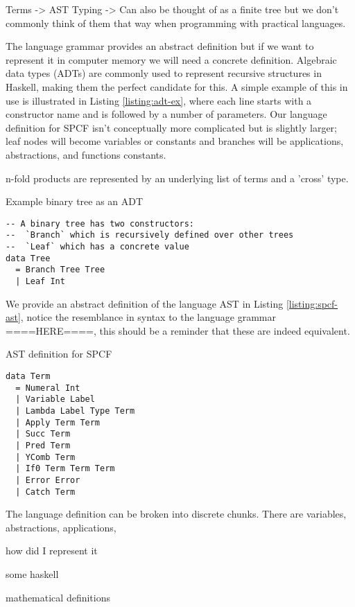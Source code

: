 \documentclass[12pt,a4paper]{report}
\theoremstyle{definition}
\theoremstyle{remark}
\begin{document}
Terms -> AST
Typing -> Can also be thought of as a finite tree but we don't commonly think of them that way when programming with practical languages.

The language grammar provides an abstract definition but if we want to represent it in computer memory we will need a concrete definition. Algebraic data types (ADTs) are commonly used to represent recursive structures in Haskell, making them the perfect candidate for this. A simple example of this in use is illustrated in Listing \ref{listing:adt-ex}, where each line starts with a constructor name and is followed by a number of parameters. Our language definition for SPCF isn't conceptually more complicated but is slightly larger; leaf nodes will become variables or constants and branches will be applications, abstractions, and functions constants. 

n-fold products are represented by an underlying list of terms and a 'cross' type.

\begin{listing}[!ht]
\caption{Example binary tree as an ADT}
\begin{verbatim}
-- A binary tree has two constructors:
--  `Branch` which is recursively defined over other trees
--  `Leaf` which has a concrete value
data Tree
  = Branch Tree Tree 
  | Leaf Int
\end{verbatim}
\label{listing:adt-ex}
\end{listing}

We provide an abstract definition of the language AST in Listing \ref{listing:spcf-ast}, notice the resemblance in syntax to the language grammar ====HERE====, this should be a reminder that these are indeed equivalent.

\begin{listing}[!ht]
\caption{AST definition for SPCF}
\begin{verbatim}
data Term
  = Numeral Int
  | Variable Label
  | Lambda Label Type Term
  | Apply Term Term 
  | Succ Term
  | Pred Term
  | YComb Term
  | If0 Term Term Term
  | Error Error
  | Catch Term
\end{verbatim}
\label{listing:spcf-ast}
\end{listing}

The language definition can be broken into discrete chunks. There are variables, abstractions, applications, 

how did I represent it

some haskell

mathematical definitions
\end{document}

